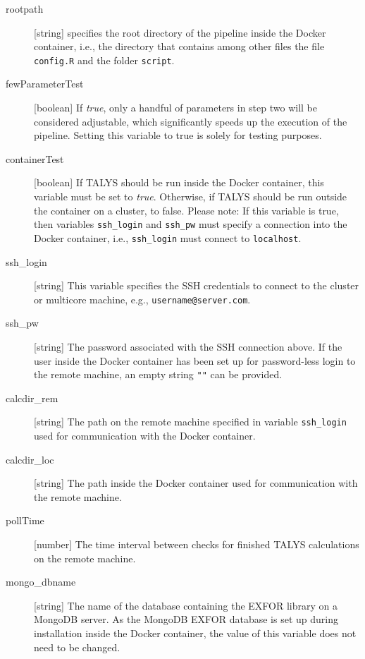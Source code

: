 \documentclass[12pt,a4paper]{scrartcl}
\begin{document}
 \begin{description}
 
 \item[rootpath]
 [string] specifies the root directory of the pipeline inside the Docker container, i.e., the directory that contains among other files the file \verb#config.R# and the folder \verb#script#.
 
 \item[fewParameterTest]
 [boolean] If \textit{true}, only a handful of parameters in step two will be considered adjustable, which significantly speeds up the execution of the pipeline.
 Setting this variable to true is solely for testing purposes.
 
 \item[containerTest]
 [boolean]
 If TALYS should be run inside the Docker container, this variable must be set to \textit{true}.
 Otherwise, if TALYS should be run outside the container on a cluster, to false.
 Please note: If this variable is true, then variables \verb#ssh_login# and \verb#ssh_pw# must specify a connection into the Docker container, i.e., \verb#ssh_login# must connect to \verb#localhost#. 
  
 \item[ssh\_login]
 [string] This variable specifies the SSH credentials to connect to the cluster or multicore machine, e.g., \verb#username@server.com#.
 
 \item[ssh\_pw]
 [string] The password associated with the SSH connection above.
 If the user inside the Docker container has been set up for password-less login to the remote machine, an empty string \verb#""# can be provided.
 
 \item[calcdir\_rem]
 [string] The path on the remote machine specified in variable \verb#ssh_login# used for communication with the Docker container.
 
 \item[calcdir\_loc]
 [string] The path inside the Docker container used for communication with the remote machine.
 
 \item[pollTime]
 [number] The time interval between checks for finished TALYS calculations on the remote machine.
 
 \item[mongo\_dbname]
 [string] The name of the database containing the EXFOR library on a MongoDB server.
 As the MongoDB EXFOR database is set up during installation inside the Docker container, the value of this variable does not need to be changed.
 

\end{description}
\end{document}
